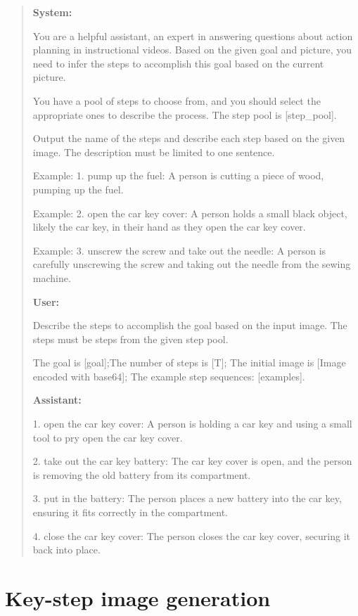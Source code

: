 \begin{quote}
\textbf{System:}

You are a helpful assistant, an expert in answering questions about action planning in instructional videos. Based on the given goal and picture, you need to infer the steps to accomplish this goal based on the current picture.

You have a pool of steps to choose from, and you should select the appropriate ones to describe the process. The step pool is [step\_pool].

Output the name of the steps and describe each step based on the given image. The description must be limited to one sentence.

Example: 1. pump up the fuel: A person is cutting a piece of wood, pumping up the fuel.

Example: 2. open the car key cover: A person holds a small black object, likely the car key, in their hand as they open the car key cover.

Example: 3. unscrew the screw and take out the needle: A person is carefully unscrewing the screw and taking out the needle from the sewing machine.

\textbf{User:}

Describe the steps to accomplish the goal based on the input image. The steps must be steps from the given step pool.

The goal is [goal];The number of steps is [T]; The initial image is [Image encoded with base64]; The example step sequences: [examples].



\textbf{Assistant:}

1. open the car key cover: A person is holding a car key and using a small tool to pry open the car key cover.

2. take out the car key battery: The car key cover is open, and the person is removing the old battery from its compartment.

3. put in the battery: The person places a new battery into the car key, ensuring it fits correctly in the compartment.

4. close the car key cover: The person closes the car key cover, securing it back into place.
\end{quote}

\section{Key-step image generation}
\label{appendix kig}

